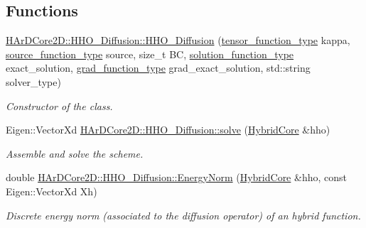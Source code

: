 \subsection*{Functions}
\begin{DoxyCompactItemize}
\item 
\hyperlink{group__HHO__Diffusion_ga9ab2e2cdf0c77f60069f7572c587c4f1}{H\+Ar\+D\+Core2\+D\+::\+H\+H\+O\+\_\+\+Diffusion\+::\+H\+H\+O\+\_\+\+Diffusion} (\hyperlink{classHArDCore2D_1_1HHO__Diffusion_acc4abb92b452d6407d45a87823fb47f9}{tensor\+\_\+function\+\_\+type} kappa, \hyperlink{classHArDCore2D_1_1HHO__Diffusion_ade095df766ff04bf09385a163136e5c0}{source\+\_\+function\+\_\+type} source, size\+\_\+t BC, \hyperlink{classHArDCore2D_1_1HHO__Diffusion_ac2ddc18a37be70e4767a9040fb6a09f6}{solution\+\_\+function\+\_\+type} exact\+\_\+solution, \hyperlink{classHArDCore2D_1_1HHO__Diffusion_a14797a72cc96ee5ea6fc45e4986d6a84}{grad\+\_\+function\+\_\+type} grad\+\_\+exact\+\_\+solution, std\+::string solver\+\_\+type)
\begin{DoxyCompactList}\small\item\em Constructor of the class. \end{DoxyCompactList}\item 
\mbox{\label{group__HHO__Diffusion_ga1aebf22f19de92c115aed69ba394de88}} 
Eigen\+::\+Vector\+Xd \hyperlink{group__HHO__Diffusion_ga1aebf22f19de92c115aed69ba394de88}{H\+Ar\+D\+Core2\+D\+::\+H\+H\+O\+\_\+\+Diffusion\+::solve} (\hyperlink{classHArDCore2D_1_1HybridCore}{Hybrid\+Core} \&hho)
\begin{DoxyCompactList}\small\item\em Assemble and solve the scheme. \end{DoxyCompactList}\item 
\mbox{\label{group__HHO__Diffusion_ga1f21d17ee818df40d6c0081300c44982}} 
double \hyperlink{group__HHO__Diffusion_ga1f21d17ee818df40d6c0081300c44982}{H\+Ar\+D\+Core2\+D\+::\+H\+H\+O\+\_\+\+Diffusion\+::\+Energy\+Norm} (\hyperlink{classHArDCore2D_1_1HybridCore}{Hybrid\+Core} \&hho, const Eigen\+::\+Vector\+Xd Xh)
\begin{DoxyCompactList}\small\item\em Discrete energy norm (associated to the diffusion operator) of an hybrid function. \end{DoxyCompactList}\item 
\mbox{\label{group__HHO__Diffusion_ga4b67f061d06b1aea5a626792a2bddd1e}} 

\end{DoxyCompactItemize}
